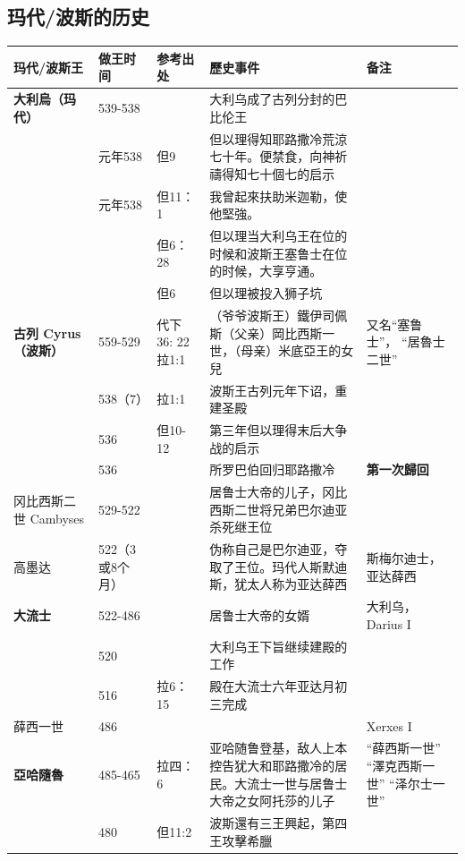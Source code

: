\subsection{玛代/波斯的历史}
\begin{table}[!hbp]
\centering 
\begin{tabular}{|p{2.5cm}|p{1.7cm}|p{1.5cm}|p{}|p{2.8cm}|}
\hline
\hline
玛代/波斯王 & 做王时间 &参考出处 & 歷史事件 &备注 \\\hline
\textbf{大利烏（玛代）}&	539-538	&	 	 &大利乌成了古列分封的巴比伦王\cite{伯沙撒}	&   \\\hline
&	元年538	&	但9	 &   但以理得知耶路撒冷荒涼七十年。便禁食，向神祈禱得知七十個七的启示&   \\\hline
&	元年538	&	但11：1	 &   我曾起來扶助米迦勒，使他堅強。&   \\\hline
 &	 	&	但6：28	 &   但以理当大利乌王在位的时候和波斯王塞鲁士在位的时候，大享亨通。	&   \\\hline
&	 	&	但6	 &   但以理被投入狮子坑	&   \\\hline
\textbf{古列 Cyrus    （波斯）}&	559-529	&代下36: 22 拉1:1 &（爷爷波斯王）鐵伊司佩斯（父亲）岡比西斯一世，（母亲）米底亞王的女兒 & 又名“塞鲁士”， “居魯士二世” \\\hline	
&538（7）\cite{居鲁士}&拉1:1 & 波斯王古列元年下诏，重建圣殿&   \\\hline	
&536&但10-12 & 第三年但以理得末后大争战的启示&   \\\hline	
&536& &所罗巴伯回归耶路撒冷& \textcolor[rgb]{0,.1,1}{\textbf{第一次歸回}} \\\hline	
冈比西斯二世 Cambyses&	529-522	&  &居鲁士大帝的儿子，冈比西斯二世将兄弟巴尔迪亚杀死继王位  &   \\\hline	
高墨达\cite{高墨达}&	522（3或8个月）&& 伪称自己是巴尔迪亚，夺取了王位。玛代人斯默迪斯，犹太人称为亚达薛西 &斯梅尔迪士，  亚达薛西    \\\hline	
\textbf{大流士}& 522-486&  &居鲁士大帝的女婿& 大利乌，Darius I\\\hline	
& 520&&大利乌王下旨继续建殿的工作& \\\hline
&516&拉6：15&殿在大流士六年亚达月初三完成& \\\hline
薛西一世  & 486 &&&Xerxes I \\\hline
\textbf{亞哈隨魯}&	485-465	&	拉四：6 \cite{亞哈隨魯} &亚哈随鲁登基，敌人上本控告犹大和耶路撒冷的居民。大流士一世与居鲁士大帝之女阿托莎的儿子&“薛西斯一世”  “澤克西斯一世” “泽尔士一世” \\\hline	
&480　&但11:2 &波斯還有三王興起，第四王攻擊希臘&\\\hline

\end{tabular}
\end{table}

